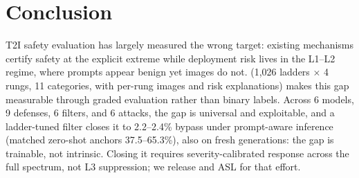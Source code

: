 \section{Conclusion}
T2I safety evaluation has largely measured the wrong target: existing mechanisms certify safety at the explicit extreme while deployment risk lives in the L1--L2 regime, where prompts appear benign yet images do not.
\dataname (1,026 ladders $\times$ 4 rungs, 11 categories, with per-rung images and risk explanations) makes this gap measurable through graded evaluation rather than binary labels.
Across 6 models, 9 defenses, 6 filters, and 6 attacks, the gap is universal and exploitable, and a ladder-tuned filter closes it to 2.2--2.4\% bypass under prompt-aware inference (matched zero-shot anchors 37.5--65.3\%), also on fresh generations: the gap is trainable, not intrinsic.
Closing it requires severity-calibrated response across the full spectrum, not L3 suppression; we release \dataname{} and ASL for that effort.
